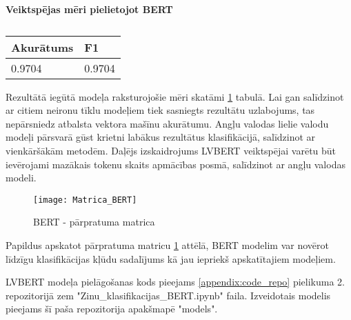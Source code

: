 \begin{table}[H]
\centering
\caption{\label{tab:score_bert}}
\textbf{Veiktspējas mēri pielietojot BERT\\}
\begin{tabular}{|l|l|}
\hline
Akurātums & F1 \\ \hline
0.9704 & 0.9704  \\ \hline
\end{tabular}
\end{table}

Rezultātā iegūtā modeļa raksturojošie mēri skatāmi \ref{tab:score_bert} tabulā. Lai gan salīdzinot ar citiem neironu tīklu modeļiem tiek sasniegts rezultātu uzlabojums, tas nepārsniedz atbalsta vektora mašīnu akurātumu. Angļu valodas lielie valodu modeļi pārsvarā gūst krietni labākus rezultātus klasifikācijā, salīdzinot ar vienkāršākām metodēm. Daļējs izskaidrojums LVBERT veiktspējai varētu būt ievērojami mazākais tokenu skaits apmācības posmā, salīdzinot ar angļu valodas modeli.

\begin{figure}[H]
	\centering
	\texttt{[image: Matrica\_BERT]}
	\caption{BERT - pārpratuma matrica}
	\label{fig:Matrica_BERT}
\end{figure}

Papildus apskatot pārpratuma matricu \ref{fig:Matrica_BERT} attēlā, BERT modelim var novērot līdzīgu klasifikācijas kļūdu sadalījums kā jau iepriekš apskatītajiem modeļiem.

LVBERT modeļa pielāgošanas kods pieejams \ref{appendix:code_repo} pielikuma 2. repozitorijā zem "Zinu\_klasifikacijas\_BERT.ipynb" faila. Izveidotais modelis pieejams šī paša repozitorija apakšmapē "models".
